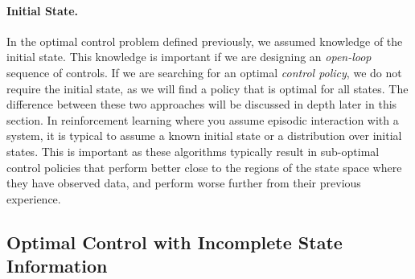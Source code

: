 \paragraph{Initial State.} In the optimal control problem defined previously, we assumed knowledge of the initial state. This knowledge is important if we are designing an \textit{open-loop} sequence of controls. If we are searching for an optimal \textit{control policy}, we do not require the initial state, as we will find a policy that is optimal for all states. The difference between these two approaches will be discussed in depth later in this section. In reinforcement learning where you assume episodic interaction with a system, it is typical to assume a known initial state or a distribution over initial states. This is important as these algorithms typically result in sub-optimal control policies that perform better close to the regions of the state space where they have observed data, and perform worse further from their previous experience. 

\subsection{Optimal Control with Incomplete State Information}

